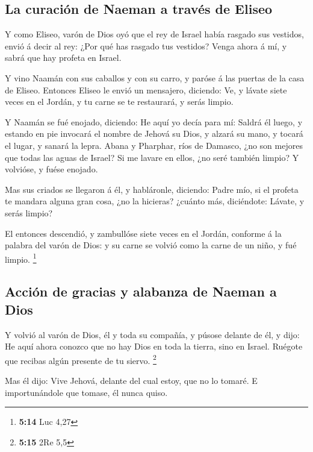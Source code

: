 \hypertarget{la-curaciuxf3n-de-naeman-a-travuxe9s-de-eliseo}{%
\subsection{La curación de Naeman a través de
Eliseo}\label{la-curaciuxf3n-de-naeman-a-travuxe9s-de-eliseo}}

 Y como Eliseo, varón de Dios oyó que el rey de Israel había
rasgado sus vestidos, envió á decir al rey: ¿Por qué has rasgado tus
vestidos? Venga ahora á mí, y sabrá que hay profeta en Israel.

 Y vino Naamán con sus caballos y con su carro, y paróse á
las puertas de la casa de Eliseo.  Entonces Eliseo le envió
un mensajero, diciendo: Ve, y lávate siete veces en el Jordán, y tu
carne se te restaurará, y serás limpio.

 Y Naamán se fué enojado, diciendo: He aquí yo decía para
mí: Saldrá él luego, y estando en pie invocará el nombre de Jehová su
Dios, y alzará su mano, y tocará el lugar, y sanará la lepra.
 Abana y Pharphar, ríos de Damasco, ¿no son mejores que
todas las aguas de Israel? Si me lavare en ellos, ¿no seré también
limpio? Y volvióse, y fuése enojado.

 Mas sus criados se llegaron á él, y habláronle, diciendo:
Padre mío, si el profeta te mandara alguna gran cosa, ¿no la hicieras?
¿cuánto más, diciéndote: Lávate, y serás limpio?

 El entonces descendió, y zambullóse siete veces en el
Jordán, conforme á la palabra del varón de Dios: y su carne se volvió
como la carne de un niño, y fué limpio. \footnote{\textbf{5:14} Luc 4,27}

\hypertarget{acciuxf3n-de-gracias-y-alabanza-de-naeman-a-dios}{%
\subsection{Acción de gracias y alabanza de Naeman a
Dios}\label{acciuxf3n-de-gracias-y-alabanza-de-naeman-a-dios}}

 Y volvió al varón de Dios, él y toda su compañía, y púsose
delante de él, y dijo: He aquí ahora conozco que no hay Dios en toda la
tierra, sino en Israel. Ruégote que recibas algún presente de tu siervo.
\footnote{\textbf{5:15} 2Re 5,5}

 Mas él dijo: Vive Jehová, delante del cual estoy, que no
lo tomaré. E importunándole que tomase, él nunca quiso.

